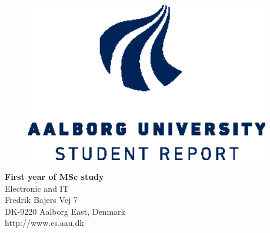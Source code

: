 {}
\thispagestyle{empty}

\begin{minipage}[t]{0.48\textwidth}
\vspace*{-25pt}			%

\begin{figure}[H] 
\includegraphics[width=0.95\textwidth]{report/introduction/aau_logo2}
\end{figure} 
\end{minipage}
\hfill
\begin{minipage}[t]{0.48\textwidth}
{\small 
\textbf{First year of MSc study}  \\
Electronic and IT \\
Fredrik Bajers Vej 7 \\
DK-9220 Aalborg East, Denmark\\
http://www.es.aau.dk}
\end{minipage}


\vspace*{1cm}


